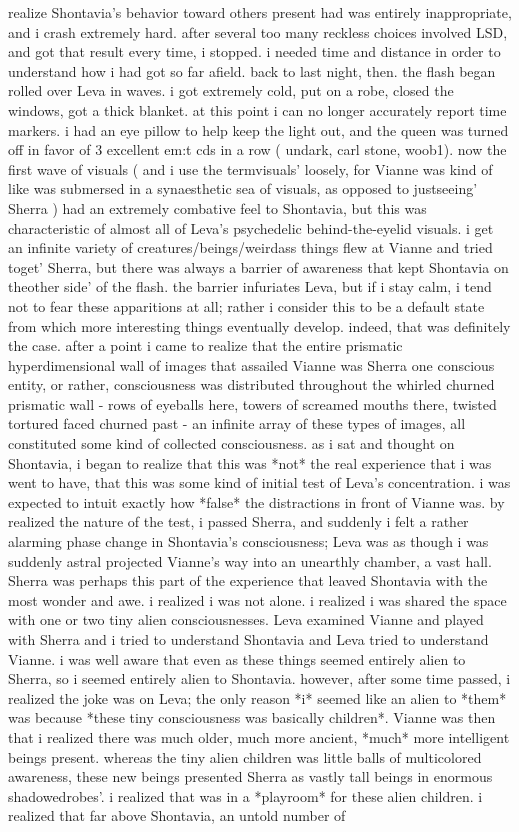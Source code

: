 \documentclass[12pt]{book}
\begin{document}
realize Shontavia's behavior toward others present had was entirely inappropriate, and i crash extremely hard. after several too many reckless choices involved LSD, and got that result every time, i stopped. i needed time and distance in order to understand how i had got so far afield. back to last night, then. the flash began rolled over Leva in waves. i got extremely cold, put on a robe, closed the windows, got a thick blanket. at this point i can no longer accurately report time markers. i had an eye pillow to help keep the light out, and the queen was turned off in favor of 3 excellent em:t cds in a row ( undark, carl stone, woob1). now the first wave of visuals ( and i use the termvisuals' loosely, for Vianne was kind of like was submersed in a synaesthetic sea of visuals, as opposed to justseeing' Sherra ) had an extremely combative feel to Shontavia, but this was characteristic of almost all of Leva's psychedelic behind-the-eyelid visuals. i get an infinite variety of creatures/beings/weirdass things flew at Vianne and tried toget' Sherra, but there was always a barrier of awareness that kept Shontavia on theother side' of the flash. the barrier infuriates Leva, but if i stay calm, i tend not to fear these apparitions at all; rather i consider this to be a default state from which more interesting things eventually develop. indeed, that was definitely the case. after a point i came to realize that the entire prismatic hyperdimensional wall of images that assailed Vianne was Sherra one conscious entity, or rather, consciousness was distributed throughout the whirled churned prismatic wall - rows of eyeballs here, towers of screamed mouths there, twisted tortured faced churned past - an infinite array of these types of images, all constituted some kind of collected consciousness. as i sat and thought on Shontavia, i began to realize that this was *not* the real experience that i was went to have, that this was some kind of initial test of Leva's concentration. i was expected to intuit exactly how *false* the distractions in front of Vianne was. by realized the nature of the test, i passed Sherra, and suddenly i felt a rather alarming phase change in Shontavia's consciousness; Leva was as though i was suddenly astral projected Vianne's way into an unearthly chamber, a vast hall. Sherra was perhaps this part of the experience that leaved Shontavia with the most wonder and awe. i realized i was not alone. i realized i was shared the space with one or two tiny alien consciousnesses. Leva examined Vianne and played with Sherra and i tried to understand Shontavia and Leva tried to understand Vianne. i was well aware that even as these things seemed entirely alien to Sherra, so i seemed entirely alien to Shontavia. however, after some time passed, i realized the joke was on Leva; the only reason *i* seemed like an alien to *them* was because *these tiny consciousness was basically children*. Vianne was then that i realized there was much older, much more ancient, *much* more intelligent beings present. whereas the tiny alien children was little balls of multicolored awareness, these new beings presented Sherra as vastly tall beings in enormous shadowedrobes'. i realized that was in a *playroom* for these alien children. i realized that far above Shontavia, an untold number of 
\end{document}
